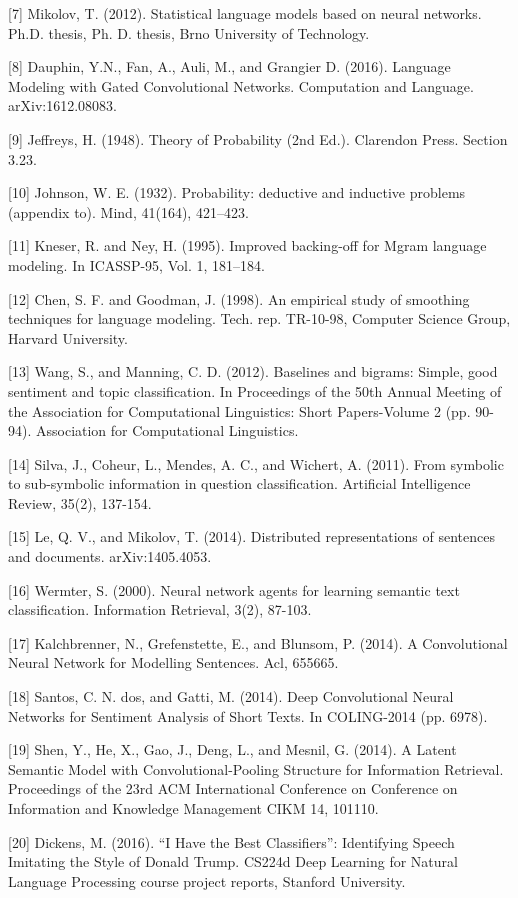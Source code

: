 \documentclass{article}
\begin{document}
[7] Mikolov, T. (2012). Statistical language models based on neural networks. Ph.D. thesis, Ph. D. thesis, Brno University of Technology.

[8] Dauphin, Y.N., Fan, A., Auli, M., and Grangier D. (2016). Language Modeling with Gated Convolutional Networks. Computation and Language. arXiv:1612.08083.

[9] Jeffreys, H. (1948). Theory of Probability (2nd Ed.). Clarendon Press. Section 3.23.

[10] Johnson, W. E. (1932). Probability: deductive and inductive problems (appendix to). Mind, 41(164), 421–423.

[11] Kneser, R. and Ney, H. (1995). Improved backing-off for Mgram language modeling. In ICASSP-95, Vol. 1, 181–184.

[12] Chen, S. F. and Goodman, J. (1998). An empirical study of smoothing techniques for language modeling. Tech. rep. TR-10-98, Computer Science Group, Harvard University.

[13] Wang, S., and Manning, C. D. (2012). Baselines and bigrams: Simple, good sentiment and topic classification. In Proceedings of the 50th Annual Meeting of the Association for Computational Linguistics: Short Papers-Volume 2 (pp. 90-94). Association for Computational Linguistics.

[14] Silva, J., Coheur, L., Mendes, A. C., and Wichert, A. (2011). From symbolic to sub-symbolic information in question classification. Artificial Intelligence Review, 35(2), 137-154.

[15] Le, Q. V., and Mikolov, T. (2014). Distributed representations of sentences and documents. arXiv:1405.4053.

[16] Wermter, S. (2000). Neural network agents for learning semantic text classification. Information Retrieval, 3(2), 87-103.

[17] Kalchbrenner, N., Grefenstette, E., and Blunsom, P. (2014). A Convolutional Neural Network for Modelling Sentences. Acl, 655665.

[18] Santos, C. N. dos, and Gatti, M. (2014). Deep Convolutional Neural Networks for Sentiment Analysis of Short Texts. In COLING-2014 (pp. 6978).

[19] Shen, Y., He, X., Gao, J., Deng, L., and Mesnil, G. (2014). A Latent Semantic Model with Convolutional-Pooling Structure for Information Retrieval. Proceedings of the 23rd ACM International Conference on Conference on Information and Knowledge Management CIKM 14, 101110.

[20] Dickens, M. (2016). “I Have the Best Classifiers”: Identifying Speech Imitating the Style of Donald Trump. CS224d Deep Learning for Natural Language Processing course project reports, Stanford University.
\end{document}
